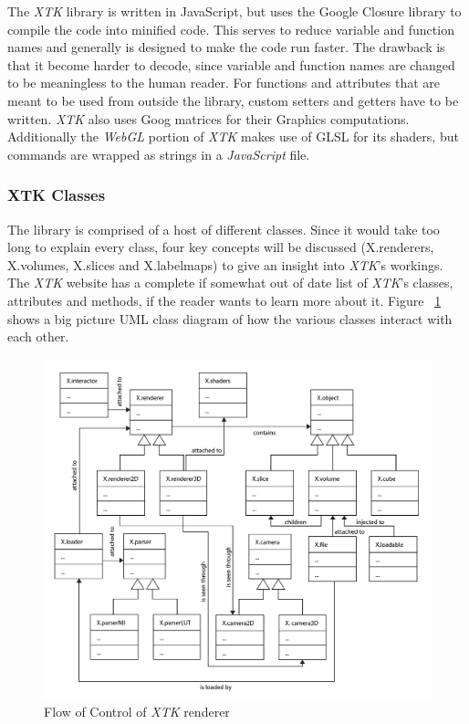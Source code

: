 \documentclass[a4paper,11pt,twoside]{article}
\begin{document}
The \textit{XTK} library is written in JavaScript, but uses the Google Closure library to compile the code into minified code. This serves to reduce variable and function names and generally is designed to make the code run faster. The drawback is that it become harder to decode, since variable and function names are changed to be meaningless to the human reader. For functions and attributes that are meant to be used from outside the library, custom setters and getters have to be written. \textit{XTK} also uses Goog matrices for their Graphics computations. Additionally the \textit{WebGL} portion of \textit{XTK} makes use of GLSL for its shaders, but commands are wrapped as strings in a \textit{JavaScript} file.

\subsubsection{XTK Classes}

The library is comprised of a host of different classes. Since it would take too long to explain every class, four key concepts will be discussed (X.renderers, X.volumes, X.slices and X.labelmaps) to give an insight into \textit{XTK}'s workings. The \textit{XTK} website has a complete if somewhat out of date list of \textit{XTK}'s classes, attributes and methods, if the reader wants to learn more about it. Figure ~\ref{fig:xtkBig} shows a big picture UML class diagram of how the various classes interact with each other.


\begin{figure}[ht!]
\centering
\includegraphics[width=165mm]{graphics/xtkUML_big_01.png}
\caption{Flow of Control of \textit{XTK} renderer}
\label{fig:xtkBig}
\end{figure}
\end{document}
